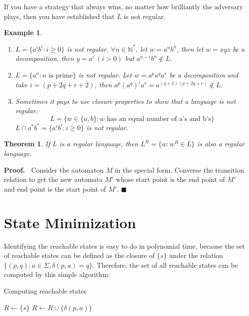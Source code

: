 \documentclass[aps,pra,onecolumn,notitlepage,superscriptaddress]{revtex4-1}
\newcommand{\N}{\mathbb{N}}
\def\l{\leftarrow}
\newtheorem{theo}{Theorem}
\newtheorem{exa}{Example}
\def\Proof{{\bf Proof.~}}
\def\qed{$\blacksquare$ \newline}
\begin{document}
    If you have a strategy that always wins, no matter how brilliantly the adversary plays, then you have established that $L$ is not regular.

    \begin{exa}
        \begin{enumerate}
            \item $L = \{ a^ib^i : i \geq 0 \}$ is not regular. $\forall n \in \N^*$, let $w = a^nb^n$, then let $w = xyz$ be a decomposition, then $y = a^i\ (i > 0)$ but $a^{n-i}b^n \notin L$.
            \item $L = \{a^n: n \text{ is prime}\}$ is not regular. Let $w = a^p a^q a^r$ be a decomposition and take $i = (p+2q+r+2)$, then $a^p (a^q)^i a^r = a^{(q+1)(p+2q+r)} \notin L$.
            \item Sometimes it pays to use closure properties to show that a language is not regular.
            \begin{equation}
                L = \{ w \in \{a,b\} : w \text{ has an equal number of a's and b's} \}
            \end{equation}
            $L \cap a^*b^* = \{ a^ib^i : i \geq 0 \}$ is not regular.
        \end{enumerate}
    \end{exa}

    \begin{theo}
        If $L$ is a regular language, then $L^R = \{ w : w^R \in L \}$ is also a regular language.
    \end{theo}
    \Proof
    Consider the automaton $M$ in the special form. Converse the transition relation to get the new automata $M'$ whose start point is the end point of $M'$ and end point is the start point of $M'$.
    \qed

\section{State Minimization}    
    Identifying the reachable states is easy to do in polynomial time, because the set of reachable states can be defined as the closure of $\{s\}$ under the relation $\{(p, q) : a \in \Sigma, \delta(p, a) = q\}$. Therefore, the set of all reachable states can be computed by this simple algorithm:
    \begin{algorithm}[H]
        \caption{Computing reachable states}
        \begin{algorithmic}[1]
            \State $R \l \{ s\}$
            \State $R \l R \cup \{ \delta(p,a) \}$
            \EndWhile
        \end{algorithmic}
    \end{algorithm}
\end{document}
